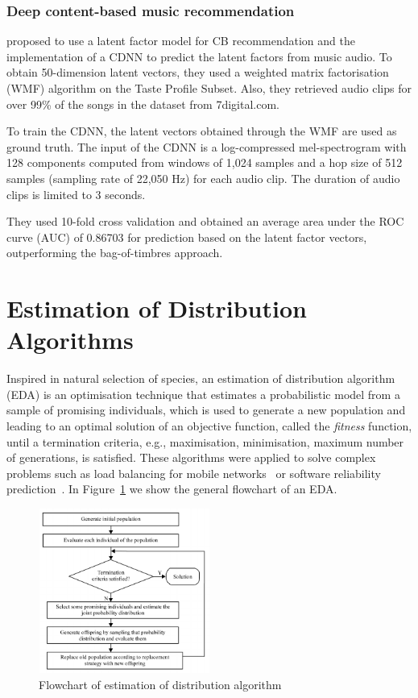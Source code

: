 \subsubsection{Deep content-based music recommendation}
\textcite{NIPS2013_5004} proposed to use a latent factor model for CB recommendation and the implementation of a CDNN to predict the latent factors from music audio. To obtain 50-dimension latent vectors, they used a weighted matrix factorisation (WMF) algorithm on the Taste Profile Subset. Also, they retrieved audio clips for over 99\% of the songs in the dataset from 7digital.com.

To train the CDNN, the latent vectors obtained through the WMF are used as ground truth. The input of the CDNN is a log-compressed mel-spectrogram with 128 components computed from windows of 1,024 samples  and a hop size of 512 samples (sampling rate of 22,050 Hz) for each audio clip. The duration of audio clips is limited to 3 seconds.

They used 10-fold cross validation and obtained an average area under the ROC curve (AUC) of 0.86703 for prediction based on the latent factor vectors, outperforming the bag-of-timbres approach.

\section{Estimation of Distribution Algorithms}
Inspired in natural selection of species, an estimation of distribution algorithm (EDA) \parencite{pelikan2015estimation, Ding2015451, Santana:Bielza:Larrañaga:Lozano:Echegoyen:Mendiburu:Armañanzas:Shakya:2009:JSSOBK:v35i07} is an optimisation technique that estimates a probabilistic model from a sample of promising individuals, which is used to generate a new population and leading to an optimal solution of an objective function, called the \textit{fitness} function, until a termination criteria, e.g., maximisation, minimisation, maximum number of generations, is satisfied. These algorithms were applied to solve complex problems such as load balancing for mobile networks~\parencite{Hejazi15} or software reliability prediction~\parencite{Jin2014113}. In Figure~\ref{fig:eda} we show the general flowchart of an EDA.

\begin{figure}[ht!]
	\centering
	\includegraphics[width=0.5\textwidth]{chapter2/eda.png}
	\caption{Flowchart of estimation of distribution algorithm \parencite{Ding2015451}}
	\label{fig:eda}
\end{figure}

